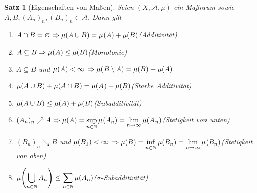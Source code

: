 \documentclass[11pt, twoside, a4paper]{article}
\theoremstyle{plain}
\newtheorem{satz}[blockelement]{Satz}
\numberwithin{equation}{subsection}
\newcommand{\pair}[1]{\left(#1\right)}
\newcommand{\of}[1]{\mathopen{}\mathclose{}\bgroup\left(#1\aftergroup\egroup\right)}
\newcommand{\impl}[0]{\Rightarrow{}}
\newcommand{\fromto}{\rightarrow{}}
\newcommand{\exclude}[0]{\setminus}
\renewcommand{\emptyset}{\varnothing}
\newcommand{\toinf}{\fromto\infty}
\newcommand{\N}{\mathbb{N}}
\newcommand{\mA}{\mathcal{A}}
\begin{document}
    \begin{satz}[Eigenschaften von Maßen] %
        \label{satz:eigenschaften-mass}
        Seien $\pair{X, \mA, \mu}$ ein Maßraum sowie $A, B, (A_n)_n, \pair{B_n}_n \in\mA$. Dann gilt
        \begin{enumerate}[label=(\roman*)]
            \item $A \cap B = \emptyset \impl \mu\of{A \cup B} = \mu\of{A} + \mu\of{B}$\hfill (Additivität)
            \item $A \subseteq B \impl \mu\of{A} \leq \mu\of{B}$\hfill (Monotonie)
            \item $A \subseteq B$ und $\mu\of{A} < \infty$ $\impl \mu\of{B\exclude A} = \mu\of{B} - \mu\of{A}$
            \item $\mu\of{A\cup B} + \mu\of{A \cap B} = \mu\of{A} + \mu\of{B}$\hfill (Starke Additivität)
            \item $\mu\of{A \cup B} \leq \mu\of{A} + \mu\of{B}$\hfill (Subadditivität)
            \item $(A_n)_n\nearrow A \impl \displaystyle\mu\of{A} = \sup_{n\in\N} \mu\of{A_n} = \lim_{n\toinf} \mu\of{A_n}$\hfill (Stetigkeit von unten)
            \item $(B_n)_n\searrow B$ und $\mu\of{B_1} < \infty$ $\impl \displaystyle\mu\of{B} = \inf_{n\in\N} \mu\of{B_n} = \lim_{n\toinf} \mu\of{B_n}$\hfill (Stetigkeit von oben)
            \item $\displaystyle\mu\of{\bigcup_{n\in\N} A_n} \leq \sum_{n\in\N}^{} \mu\of{A_n}$\hfill ($\sigma$-Subadditivität)
        \end{enumerate}


\end{satz}
\end{document}
